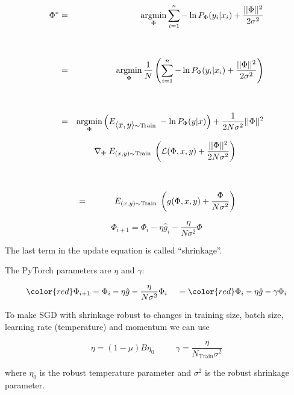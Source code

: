 {

\begin{eqnarray*}
\Phi^* & = & \operatorname*{argmin}_\Phi \sum_{i = 1}^n - \ln P_\Phi(y_i|x_i) + \frac{||\Phi||^2}{2\sigma^2}  \\
\\
\\
& = & \operatorname*{argmin}_\Phi \frac{1}{N} \left(\sum_{i = 1}^n - \ln P_\Phi(y_i|x_i) + \frac{||\Phi||^2}{2\sigma^2}\right)  \\
\\
\\
& = & \operatorname*{argmin}_\Phi \left(E_{{\mbox{$\langle x,y\rangle$}}\sim \mathrm{Train}}\;-\ln P_\Phi(y|x)\right) + \frac{1}{2N\sigma^2} ||\Phi||^2
\end{eqnarray*}


\begin{eqnarray*}
  & & \nabla_\Phi \;E_{(x,y) \sim \mathrm{Train}}\;\left({\cal L}(\Phi,x,y) + \frac{||\Phi||^2}{2N\sigma^2}\right) \\
  \\
  \\
  & = & E_{(x,y) \sim \mathrm{Train}} \;\left(g(\Phi,x,y) + \frac{\Phi}{N\sigma^2}\right)
\end{eqnarray*}

\vfill
$$\Phi_{i+1} = \Phi_i - \eta\hat{g}_i  - \frac{\eta}{N\sigma^2}\Phi$$

\vfill
The last term in the update equation is called ``shrinkage''.


The PyTorch parameters are $\eta$ and $\gamma$:

$${\color{red} \Phi_{i+1}} = \Phi_i - \eta\hat{g} - \frac{\eta}{N\sigma^2}\Phi_i\;\;\;\; = {\color{red} \Phi_i - \eta\hat{g} - \gamma\Phi_i}$$

\vfill
To make SGD with shrinkage robust to changes in training size, batch size, learning rate (temperature) and momentum we can use

\vfill
{\color{red} $$\eta = (1-\mu)B\eta_0\;\;\;\;\;\;\;\;\;\gamma = \frac{\eta}{N_{\mathrm{Train}}\sigma^2}$$}

\vfill
where $\eta_0$ is the robust temperature parameter and $\sigma^2$ is the robust shrinkage parameter.


}

